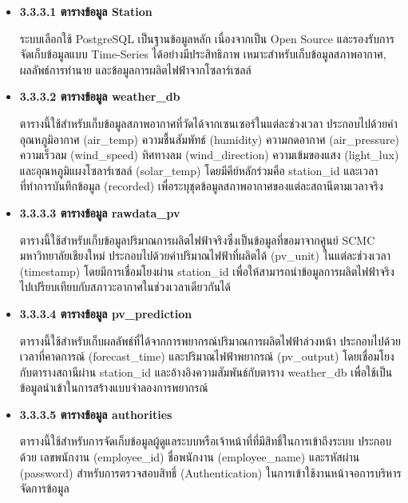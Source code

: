 \begin{itemize}
    \item[]\textbf{3.3.3.1 ตารางข้อมูล Station}

    \hspace{\parindent} ระบบเลือกใช้ PostgreSQL เป็นฐานข้อมูลหลัก เนื่องจากเป็น Open Source และรองรับการจัดเก็บข้อมูลแบบ Time-Series ได้อย่างมีประสิทธิภาพ เหมาะสำหรับเก็บข้อมูลสภาพอากาศ, ผลลัพธ์การทำนาย และข้อมูลการผลิตไฟฟ้าจากโซลาร์เซลล์

    \item[]\textbf{3.3.3.2 ตารางข้อมูล weather\_db}

    \hspace{\parindent} ตารางนี้ใช้สำหรับเก็บข้อมูลสภาพอากาศที่วัดได้จากเซนเซอร์ในแต่ละช่วงเวลา ประกอบไปด้วยค่าอุณหภูมิอากาศ (air\_temp) ความชื้นสัมพัทธ์ (humidity) ความกดอากาศ (air\_pressure) ความเร็วลม (wind\_speed) ทิศทางลม (wind\_direction) ความเข้มของแสง (light\_lux) และอุณหภูมิแผงโซลาร์เซลล์ (solar\_temp) โดยมีคีย์หลักร่วมคือ station\_id และเวลาที่ทำการบันทึกข้อมูล (recorded) เพื่อระบุชุดข้อมูลสภาพอากาศของแต่ละสถานีตามเวลาจริง

    \item[]\textbf{3.3.3.3 ตารางข้อมูล rawdata\_pv}

    \hspace{\parindent} ตารางนี้ใช้สำหรับเก็บข้อมูลปริมาณการผลิตไฟฟ้าจริงซึ่งเป็นข้อมูลที่ขอมาจากศูนย์ SCMC มหาวิทยาลัยเชียงใหม่ ประกอบไปด้วยค่าปริมาณไฟฟ้าที่ผลิตได้ (pv\_unit) ในแต่ละช่วงเวลา (timestamp) โดยมีการเชื่อมโยงผ่าน station\_id เพื่อให้สามารถนำข้อมูลการผลิตไฟฟ้าจริงไปเปรียบเทียบกับสภาวะอากาศในช่วงเวลาเดียวกันได้
    
    \item[]\textbf{3.3.3.4 ตารางข้อมูล pv\_prediction}

    \hspace{\parindent} ตารางนี้ใช้สำหรับเก็บผลลัพธ์ที่ได้จากการพยากรณ์ปริมาณการผลิตไฟฟ้าล่วงหน้า ประกอบไปด้วยเวลาที่คาดการณ์ (forecast\_time) และปริมาณไฟฟ้าพยากรณ์ (pv\_output) โดยเชื่อมโยงกับตารางสถานีผ่าน station\_id และอ้างอิงความสัมพันธ์กับตาราง weather\_db เพื่อใช้เป็นข้อมูลนำเข้าในการสร้างแบบจำลองการพยากรณ์

    \item[]\textbf{3.3.3.5 ตารางข้อมูล authorities}
    
    \hspace{\parindent} ตารางนี้ใช้สำหรับการจัดเก็บข้อมูลผู้ดูแลระบบหรือเจ้าหน้าที่ที่มีสิทธิ์ในการเข้าถึงระบบ ประกอบด้วย เลขพนักงาน (employee\_id) ชื่อพนักงาน (employee\_name) และรหัสผ่าน (password) สำหรับการตรวจสอบสิทธิ์ (Authentication) ในการเข้าใช้งานหน้าจอการบริหารจัดการข้อมูล

\end{itemize}

